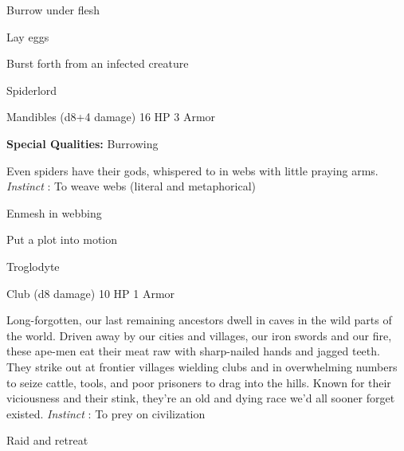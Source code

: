 \item Burrow under flesh

         
\item Lay eggs

         
\item Burst forth from an infected creature

       
\stopitemize
       
\startMonsterName
Spiderlord	 
\stopMonsterName
       

Mandibles (d8+4 damage)	16 HP	3 Armor

       


       
\startMonsterQualities
         {\bf Special Qualities:}  Burrowing
\stopMonsterQualities
       
\startMonsterDescription
Even spiders have their gods, whispered to in webs with little praying arms. {\em Instinct} : To weave webs (literal and metaphorical)
\stopMonsterDescription
       
\startitemize[1,packed]
         
\item Enmesh in webbing

         
\item Put a plot into motion

       
\stopitemize
       
\startMonsterName
Troglodyte	 
\stopMonsterName
       

Club (d8 damage)	10 HP	1 Armor

       


       
\startMonsterDescription
Long-forgotten, our last remaining ancestors dwell in caves in the wild parts of the world. Driven away by our cities and villages, our iron swords and our fire, these ape-men eat their meat raw with sharp-nailed hands and jagged teeth. They strike out at frontier villages wielding clubs and in overwhelming numbers to seize cattle, tools, and poor prisoners to drag into the hills. Known for their viciousness and their stink, they’re an old and dying race we’d all sooner forget existed. {\em Instinct} : To prey on civilization
\stopMonsterDescription
       
\startitemize[1,packed]
         
\item Raid and retreat

